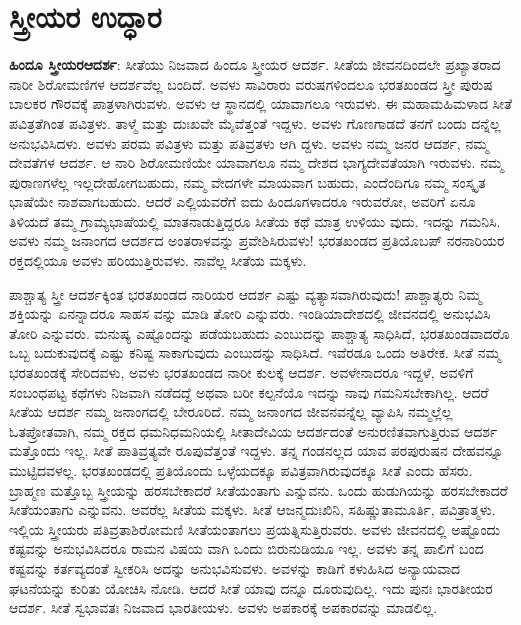 
\chapter{ಸ್ತ್ರೀಯರ ಉದ್ಧಾರ}

\textbf{ಹಿಂದೂ ಸ್ತ್ರೀಯರಆದರ್ಶ}: ಸೀತೆಯು ನಿಜವಾದ ಹಿಂದೂ ಸ್ತ್ರೀಯರ ಆದರ್ಶ. ಸೀತೆಯ ಜೀವನದಿಂದಲೇ ಪ್ರಖ್ಯಾತರಾದ ನಾರೀ ಶಿರೋಮಣಿಗಳ ಆದರ್ಶವೆಲ್ಲ ಬಂದಿದೆ. ಅವಳು ಸಾವಿರಾರು ವರುಷಗಳಿಂದಲೂ ಭರತಖಂಡದ ಸ್ತ್ರೀ ಪುರುಷ ಬಾಲಕರ ಗೌರವಕ್ಕೆ ಪಾತ್ರಳಾಗಿರುವಳು. ಅವಳು ಆ ಸ್ಥಾನದಲ್ಲಿ ಯಾವಾಗಲೂ ಇರುವಳು. ಈ ಮಹಾಮಹಿಮಳಾದ ಸೀತೆ ಪವಿತ್ರತೆಗಿಂತ ಪವಿತ್ರಳು. ತಾಳ್ಮೆ ಮತ್ತು ದುಃಖವೇ ಮೈವೆತ್ತಂತೆ ಇದ್ದಳು. ಅವಳು ಗೊಣಗಾಡದೆ ತನಗೆ ಬಂದು ದನ್ನೆಲ್ಲ ಅನುಭವಿಸಿದಳು. ಅವಳು ಪರಮ ಪವಿತ್ರಳು ಮತ್ತು ಪತಿವ್ರತಳು ಆಗಿ ದ್ದಳು. ಅವಳು ನಮ್ಮ ಜನರ ಆದರ್ಶ, ನಮ್ಮ ದೇವತೆಗಳ ಆದರ್ಶ. ಆ ನಾರಿ ಶಿರೋಮಣಿಯೇ ಯಾವಾಗಲೂ ನಮ್ಮ ದೇಶದ ಭಾಗ್ಯದೇವತೆಯಾಗಿ ಇರುವಳು. ನಮ್ಮ ಪುರಾಣಗಳೆಲ್ಲ ಇಲ್ಲದೇಹೋಗಬಹುದು, ನಮ್ಮ ವೇದಗಳೇ ಮಾಯವಾಗ ಬಹುದು, ಎಂದೆಂದಿಗೂ ನಮ್ಮ ಸಂಸ್ಕೃತ ಭಾಷೆಯೇ ನಾಶವಾಗಬಹುದು. ಆದರೆ ಎಲ್ಲಿಯವರೆಗೆ ಐದು ಹಿಂದೂಗಳಾದರೂ ಇರುವರೋ, ಅವರಿಗೆ ಏನೂ ತಿಳಿಯದೆ ತಮ್ಮ ಗ್ರಾಮ್ಯಭಾಷೆಯಲ್ಲಿ ಮಾತನಾಡುತ್ತಿದ್ದರೂ ಸೀತೆಯ ಕಥೆ ಮಾತ್ರ ಉಳಿಯು ವುದು. ಇದನ್ನು ಗಮನಿಸಿ. ಅವಳು ನಮ್ಮ ಜನಾಂಗದ ಆದರ್ಶದ ಅಂತರಾಳವನ್ನು ಪ್ರವೇಶಿಸಿರುವಳು! ಭರತಖಂಡದ ಪ್ರತಿಯೊಬಪ್ ನರನಾರಿಯರ ರಕ್ತದಲ್ಲಿಯೂ ಅವಳು ಹರಿಯುತ್ತಿರುವಳು. ನಾವೆಲ್ಲ ಸೀತೆಯ ಮಕ್ಕಳು.

ಪಾಶ್ಚಾತ್ಯ ಸ್ತ್ರೀ ಆದರ್ಶಕ್ಕಿಂತ ಭರತಖಂಡದ ನಾರಿಯರ ಆದರ್ಶ ಎಷ್ಟು ವ್ಯತ್ಯಾಸವಾಗಿರುವುದು! ಪಾಶ್ಚಾತ್ಯರು ನಿಮ್ಮ ಶಕ್ತಿಯನ್ನು ಏನನ್ನಾದರೂ ಸಾಹಸ ವನ್ನು ಮಾಡಿ ತೋರಿ ಎನ್ನುವರು. ಇಂಡಿಯಾದೇಶದಲ್ಲಿ ಜೀವನದಲ್ಲಿ ಅನುಭವಿಸಿ ತೋರಿ ಎನ್ನುವರು. ಮನುಷ್ಯ ಎಷ್ಟೊಂದನ್ನು ಪಡೆಯಬಹುದು ಎಂಬುದನ್ನು ಪಾಶ್ಚಾತ್ಯ ಸಾಧಿಸಿದೆ, ಭರತಖಂಡವಾದರೊ ಒಬ್ಬ ಬದುಕುವುದಕ್ಕೆ ಎಷ್ಟು ಕನಿಷ್ಟ ಸಾಕಾಗುವುದು ಎಂಬುದನ್ನು ಸಾಧಿಸಿದೆ. ಇವೆರಡೂ ಒಂದು ಅತಿರೇಕ. ಸೀತೆ ನಮ್ಮ ಭರತಖಂಡಕ್ಕೆ ಸೇರಿದವಳು, ಅವಳು ಭರತಖಂಡದ ನಾರೀ ಕುಲಕ್ಕೆ ಆದರ್ಶ. ಅವಳೇನಾದರೂ ಇದ್ದಳೆ, ಅವಳಿಗೆ ಸಂಬಂಧಪಟ್ಟ ಕಥೆಗಳು ನಿಜವಾಗಿ ನಡೆದದ್ದೆ ಅಥವಾ ಬರೀ ಕಲ್ಪನೆಯೊ ಇದನ್ನು ನಾವು ಗಮನಿಸಬೇಕಾಗಿಲ್ಲ. ಆದರೆ ಸೀತೆಯ ಆದರ್ಶ ನಮ್ಮ ಜನಾಂಗದಲ್ಲಿ ಬೇರೂರಿದೆ. ನಮ್ಮ ಜನಾಂಗದ ಜೀವನವನ್ನೆಲ್ಲ ವ್ಯಾಪಿಸಿ ನಮ್ಮಲ್ಲೆಲ್ಲ ಓತಪ್ರೋತವಾಗಿ, ನಮ್ಮ ರಕ್ತದ ಧಮನಿಧಮನಿಯಲ್ಲಿ ಸೀತಾದೇವಿಯ ಆದರ್ಶದಂತೆ ಅನುರಣಿತವಾಗುತ್ತಿರುವ ಆದರ್ಶ ಮತ್ತೊಂದು ಇಲ್ಲ. ಸೀತೆ ಪಾತಿವ್ರತ್ಯವೇ ರೂಪುವೆತ್ತಂತೆ ಇದ್ದಳು. ತನ್ನ ಗಂಡನಲ್ಲದ ಯಾವ ಪರಪುರುಷನ ದೇಹವನ್ನೂ ಮುಟ್ಟಿದವಳಲ್ಲ. ಭರತಖಂಡದಲ್ಲಿ ಪ್ರತಿಯೊಂದು ಒಳ್ಳೆಯದಕ್ಕೂ ಪವಿತ್ರವಾಗಿರುವುದಕ್ಕೂ ಸೀತೆ ಎಂದು ಹೆಸರು. ಬ್ರಾಹ್ಮಣ ಮತ್ತೊಬ್ಬ ಸ್ತ್ರೀಯನ್ನು ಹರಸಬೇಕಾದರೆ ಸೀತೆಯಂತಾಗು ಎನ್ನುವನು. ಒಂದು ಹುಡುಗಿಯನ್ನು ಹರಸಬೇಕಾದರೆ ಸೀತೆಯಂತಾಗು ಎನ್ನುವನು. ಅವರೆಲ್ಲ ಸೀತೆಯ ಮಕ್ಕಳು. ಸೀತೆ ಆಜನ್ಮದುಃಖಿನಿ, ಸಹಿಷ್ಣುತಾಮೂರ್ತಿ, ಪವಿತ್ರಾತ್ಮಳು. ಇಲ್ಲಿಯ ಸ್ತ್ರೀಯರು ಪತಿವ್ರತಾಶಿರೋಮಣಿ ಸೀತೆಯಂತಾಗಲು ಪ್ರಯತ್ನಿಸುತ್ತಿರುವರು. ಅವಳು ಜೀವನದಲ್ಲಿ ಅಷ್ಟೊಂದು ಕಷ್ಟವನ್ನು ಅನುಭವಿಸಿದರೂ ರಾಮನ ವಿಷಯ ವಾಗಿ ಒಂದು ಬಿರುನುಡಿಯೂ ಇಲ್ಲ. ಅವಳು ತನ್ನ ಪಾಲಿಗೆ ಬಂದ ಕಷ್ಟವನ್ನು ಕರ್ತವ್ಯದಂತೆ ಸ್ವೀಕರಿಸಿ ಅದನ್ನು ಅನುಭವಿಸುವಳು. ಅವಳನ್ನು ಕಾಡಿಗೆ ಕಳುಹಿಸಿದ ಅನ್ಯಾಯವಾದ ಘಟನೆಯನ್ನು ಕುರಿತು ಯೋಚಿಸಿ ನೋಡಿ. ಆದರೆ ಸೀತೆ ಯಾವು ದನ್ನೂ ದೂರುವುದಿಲ್ಲ. ಇದು ಪುನಃ ಭಾರತೀಯರ ಆದರ್ಶ. ಸೀತೆ ಸ್ವಭಾವತಃ ನಿಜವಾದ ಭಾರತೀಯಳು. ಅವಳು ಅಪಕಾರಕ್ಕೆ ಅಪಕಾರವನ್ನು ಮಾಡಲಿಲ್ಲ.

